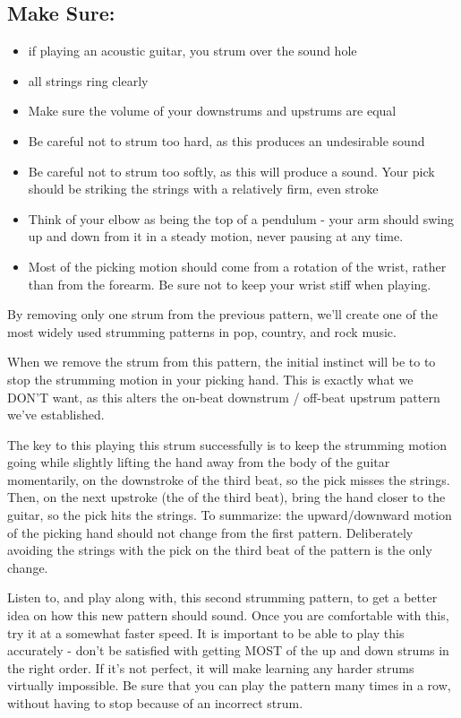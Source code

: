\subsection{Make Sure:}
\begin{itemize}
\item if playing an acoustic guitar, you strum over the sound hole
\item all strings ring clearly
\item Make sure the volume of your downstrums and upstrums are equal
\item Be careful not to strum too hard, as this produces an undesirable sound
\item Be careful not to strum too softly, as this will produce a  sound.
      Your pick should be striking the strings with a relatively firm, even stroke
\item Think of your elbow as being the top of a pendulum - your arm should
      swing up and down from it in a steady motion, never pausing at any time.
\item Most of the picking motion should come from a rotation of the wrist,
      rather than from the forearm. Be sure not to keep your wrist stiff when
      playing.
\end{itemize}
%
By removing only one strum from the previous pattern, we'll create one of the
most widely used strumming patterns in pop, country, and rock music.

When we remove the strum from this pattern, the initial instinct will be to to
stop the strumming motion in your picking hand. This is exactly what we DON'T
want, as this alters the on-beat downstrum / off-beat upstrum pattern we've
established.

The key to this playing this strum successfully is to keep the strumming motion
going while slightly lifting the hand away from the body of the guitar
momentarily, on the downstroke of the third beat, so the pick misses the
strings. Then, on the next upstroke (the  of the third beat), bring the
hand closer to the guitar, so the pick hits the strings. To summarize: the
upward/downward motion of the picking hand should not change from the first
pattern. Deliberately avoiding the strings with the pick on the third beat of
the pattern is the only change.

Listen to, and play along with, this second strumming pattern, to get a better
idea on how this new pattern should sound. Once you are comfortable with this,
try it at a somewhat faster speed. It is important to be able to play this
accurately - don't be satisfied with getting MOST of the up and down strums in
the right order. If it's not perfect, it will make learning any harder strums
virtually impossible. Be sure that you can play the pattern many times in a
row, without having to stop because of an incorrect strum.

